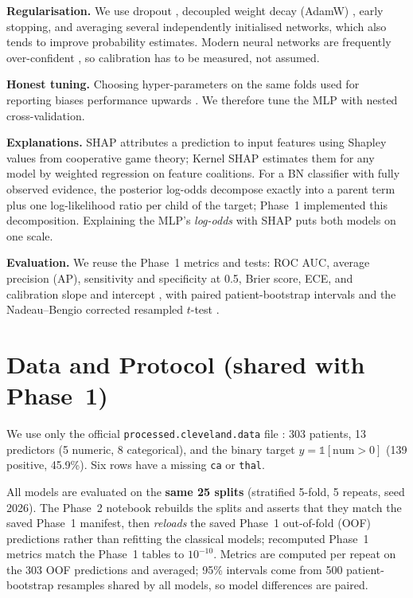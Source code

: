 \documentclass[conference]{IEEEtran}
\begin{document}
\textbf{Regularisation.} We use dropout \cite{srivastava2014}, decoupled weight decay (AdamW) \cite{loshchilov2019}, early stopping, and averaging several independently initialised networks, which also tends to improve probability estimates. Modern neural networks are frequently over-confident \cite{guo2017}, so calibration has to be measured, not assumed.

\textbf{Honest tuning.} Choosing hyper-parameters on the same folds used for reporting biases performance upwards \cite{varma2006}. We therefore tune the MLP with nested cross-validation.

\textbf{Explanations.} SHAP \cite{lundberg2017} attributes a prediction to input features using Shapley values from cooperative game theory; Kernel SHAP estimates them for any model by weighted regression on feature coalitions. For a BN classifier with fully observed evidence, the posterior log-odds decompose exactly into a parent term plus one log-likelihood ratio per child of the target; Phase~1 implemented this decomposition. Explaining the MLP's \emph{log-odds} with SHAP puts both models on one scale.

\textbf{Evaluation.} We reuse the Phase~1 metrics and tests: ROC AUC, average precision (AP), sensitivity and specificity at 0.5, Brier score, ECE, and calibration slope and intercept \cite{steyerberg2010}, with paired patient-bootstrap intervals and the Nadeau--Bengio corrected resampled $t$-test \cite{nadeau2003}.

\section{Data and Protocol (shared with Phase~1)}
We use only the official \texttt{processed.cleveland.data} file \cite{janosi1989uci}: 303 patients, 13 predictors (5 numeric, 8 categorical), and the binary target $y=\mathbb{1}[\mathrm{num}>0]$ (139 positive, 45.9\%). Six rows have a missing \texttt{ca} or \texttt{thal}.

All models are evaluated on the \textbf{same 25 splits} (stratified 5-fold, 5 repeats, seed 2026). The Phase~2 notebook rebuilds the splits and asserts that they match the saved Phase~1 manifest, then \emph{reloads} the saved Phase~1 out-of-fold (OOF) predictions rather than refitting the classical models; recomputed Phase~1 metrics match the Phase~1 tables to $10^{-10}$. Metrics are computed per repeat on the 303 OOF predictions and averaged; 95\% intervals come from 500 patient-bootstrap resamples shared by all models, so model differences are paired.
\end{document}
